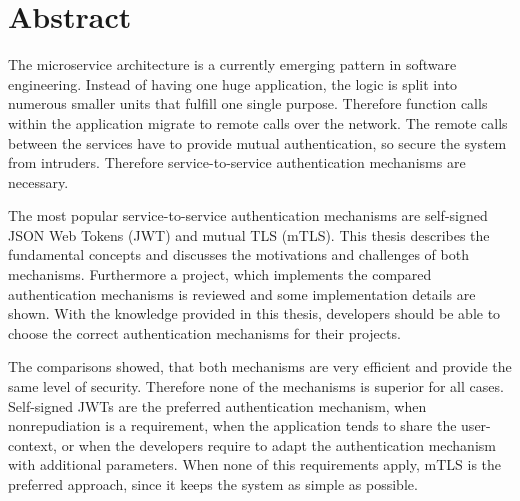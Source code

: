 \chapter{Abstract}
The microservice architecture is a currently emerging pattern in software engineering.
Instead of having one huge application, the logic is split into numerous smaller units that fulfill one single purpose.
Therefore function calls within the application migrate to remote calls over the network.
The remote calls between the services have to provide mutual authentication, so secure the system from intruders.
Therefore service-to-service authentication mechanisms are necessary. 

The most popular service-to-service authentication mechanisms are self-signed JSON Web Tokens (JWT) and mutual TLS (mTLS).
This thesis describes the fundamental concepts and discusses the motivations and challenges of both mechanisms.
Furthermore a project, which implements the compared authentication mechanisms is reviewed and some implementation details are shown.
With the knowledge provided in this thesis, developers should be able to choose the correct authentication mechanisms for their projects. 

The comparisons showed, that both mechanisms are very efficient and provide the same level of security.
Therefore none of the mechanisms is superior for all cases.
Self-signed JWTs are the preferred authentication mechanism, when nonrepudiation is a requirement, when the application tends to share the user-context, or when the developers require to adapt the authentication mechanism with additional parameters.
When none of this requirements apply, mTLS is the preferred approach, since it keeps the system as simple as possible.

